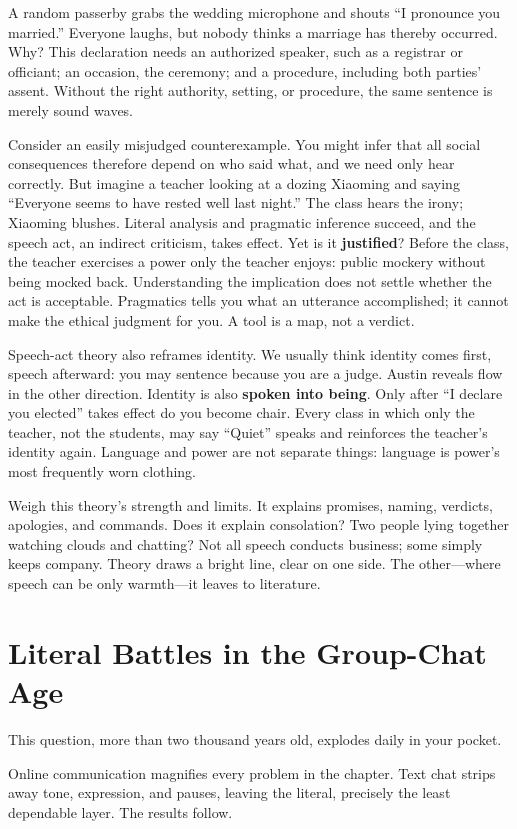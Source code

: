 A random passerby grabs the wedding microphone and shouts ``I pronounce you married.'' Everyone laughs, but nobody thinks a marriage has thereby occurred. Why? This declaration needs an authorized speaker, such as a registrar or officiant; an occasion, the ceremony; and a procedure, including both parties' assent. Without the right authority, setting, or procedure, the same sentence is merely sound waves.

Consider an easily misjudged counterexample. You might infer that all social consequences therefore depend on who said what, and we need only hear correctly. But imagine a teacher looking at a dozing Xiaoming and saying ``Everyone seems to have rested well last night.'' The class hears the irony; Xiaoming blushes. Literal analysis and pragmatic inference succeed, and the speech act, an indirect criticism, takes effect. Yet is it \textbf{justified}? Before the class, the teacher exercises a power only the teacher enjoys: public mockery without being mocked back. Understanding the implication does not settle whether the act is acceptable. Pragmatics tells you what an utterance accomplished; it cannot make the ethical judgment for you. A tool is a map, not a verdict.

Speech-act theory also reframes identity. We usually think identity comes first, speech afterward: you may sentence because you are a judge. Austin reveals flow in the other direction. Identity is also \textbf{spoken into being}. Only after ``I declare you elected'' takes effect do you become chair. Every class in which only the teacher, not the students, may say ``Quiet'' speaks and reinforces the teacher's identity again. Language and power are not separate things: language is power's most frequently worn clothing.

Weigh this theory's strength and limits. It explains promises, naming, verdicts, apologies, and commands. Does it explain consolation? Two people lying together watching clouds and chatting? Not all speech conducts business; some simply keeps company. Theory draws a bright line, clear on one side. The other---where speech can be only warmth---it leaves to literature.

\section{Literal Battles in the Group-Chat Age}
This question, more than two thousand years old, explodes daily in your pocket.

Online communication magnifies every problem in the chapter. Text chat strips away tone, expression, and pauses, leaving the literal, precisely the least dependable layer. The results follow.


